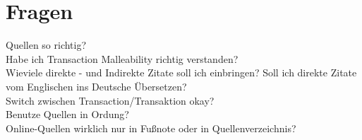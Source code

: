 
\section{Fragen}
Quellen so richtig? \\
Habe ich Transaction Malleability richtig verstanden? \\
Wieviele direkte - und Indirekte Zitate soll ich einbringen? Soll ich direkte Zitate vom Englischen ins Deutsche Übersetzen? \\
Switch zwischen Transaction/Transaktion okay? \\
Benutze Quellen in Ordung? \\
Online-Quellen wirklich nur in Fußnote oder in Quellenverzeichnis?